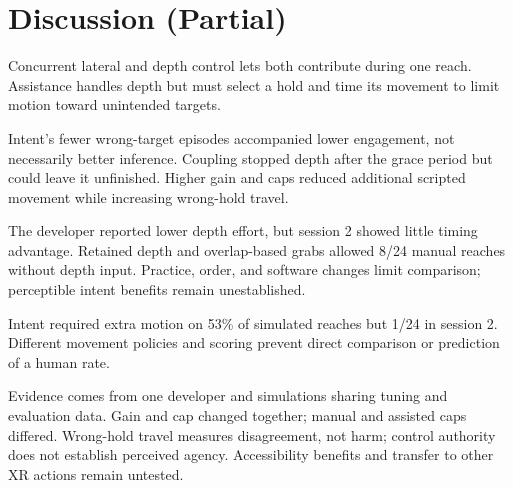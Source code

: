 \section{Discussion (Partial)}

Concurrent lateral and depth control lets both contribute during one reach.
Assistance handles depth but must select a hold and time its movement to
limit motion toward unintended targets.

Intent's fewer wrong-target episodes accompanied lower engagement, not
necessarily better inference. Coupling stopped depth after the grace period
but could leave it unfinished. Higher gain and caps reduced additional
scripted movement while increasing wrong-hold travel.

The developer reported lower depth effort, but session 2 showed little timing
advantage. Retained depth and overlap-based grabs allowed 8/24 manual reaches
without depth input. Practice, order, and software changes limit comparison;
perceptible intent benefits remain unestablished.

Intent required extra motion on 53\% of simulated reaches but 1/24 in session 2.
Different movement policies and scoring prevent direct comparison or prediction
of a human rate.

Evidence comes from one developer and simulations sharing tuning and evaluation
data. Gain and cap changed together; manual and assisted caps differed.
Wrong-hold travel measures disagreement, not harm; control authority does not
establish perceived agency. Accessibility benefits and transfer to other XR
actions remain untested.
